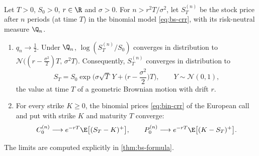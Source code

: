 \begin{theorem}\label{thm:bs-limit}
Let $T>0$, $S_0>0$, $r\in\R$ and $\sigma>0$. For $n>r^2T/\sigma^2$, let $S^{(n)}_T$ be the
stock price after $n$ periods (at time $T$) in the binomial model \eqref{eq:bs-crr}, with
its risk-neutral measure $\Q_n$.
\begin{enumerate}[label=(\roman*)]
  \item $q_n\to\frac12$. Under $\Q_n$, $\log(S^{(n)}_T/S_0)$ converges in distribution to
    $\mathcal N\big((r-\frac{\sigma^2}2)T,\,\sigma^2T\big)$. Consequently, $S^{(n)}_T$ converges
    in distribution to
    \begin{equation}\label{eq:bs-ST}
      S_T=S_0\exp\Big(\sigma\sqrt T\,Y+\Big(r-\frac{\sigma^2}2\Big)T\Big),\qquad Y\sim\mathcal N(0,1),
    \end{equation}
    the value at time $T$ of a geometric Brownian motion with drift $r$.
  \item For every strike $K\ge0$, the binomial prices \eqref{eq:bin-crr} of the European call
    and put with strike $K$ and maturity $T$ converge:
    \[
      C^{(n)}_0\longrightarrow e^{-rT}\E\big[(S_T-K)^+\big],\qquad
      P^{(n)}_0\longrightarrow e^{-rT}\E\big[(K-S_T)^+\big].
    \]
\end{enumerate}
\end{theorem}

The limits are computed explicitly in \cref{thm:bs-formula}.

